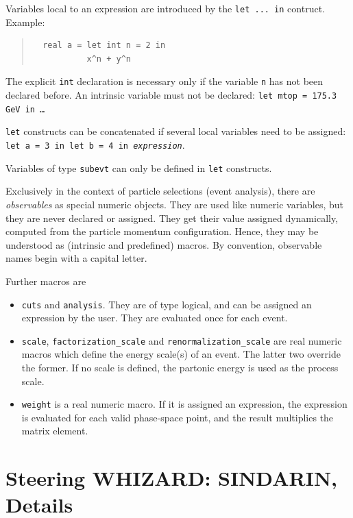 \documentclass[12pt]{book}
\newcommand{\ttt}[1]{\texttt{#1}}
\begin{document}
Variables local to an expression are introduced by the \ttt{let ... in}
contruct.  Example:
\begin{quote}
\begin{footnotesize}
\begin{verbatim}
  real a = let int n = 2 in
           x^n + y^n 
\end{verbatim}
\end{footnotesize}
\end{quote}
The explicit \ttt{int} declaration is necessary only if the variable \ttt{n}
has not been declared before.  An intrinsic variable must not be declared:
\ttt{let mtop = 175.3 GeV in \ldots}

\ttt{let} constructs can be concatenated if several local variables need to
be assigned: \ttt{let a = 3 in let b = 4 in \textit{expression}}.

Variables of type \ttt{subevt} can only be defined in \ttt{let} constructs.

Exclusively in the context of particle selections (event analysis), there are
\emph{observables} as special numeric objects.  They are used like numeric
variables, but they are never declared or assigned.  They get their value
assigned dynamically, computed from the particle momentum configuration.
Hence, they may be understood as (intrinsic and predefined) macros.
By convention, observable names begin with a capital letter.

Further macros are
\begin{itemize}
\item
  \ttt{cuts} and \ttt{analysis}.  They are of type logical, and can be
  assigned an expression by the user.  They are evaluated once for
  each event.
\item
  \ttt{scale}, \ttt{factorization\_scale} and
  \ttt{renormalization\_scale} are real numeric macros which define the
  energy scale(s) of an event.  The latter two override the former.
  If no scale is defined, the partonic energy is used as the process scale.
\item 
  \ttt{weight} is a real numeric macro.  If it is assigned an
  expression, the expression is evaluated for each valid phase-space
  point, and the result multiplies the matrix element.
\end{itemize}



\chapter{Steering WHIZARD: SINDARIN, Details}
\end{document}
